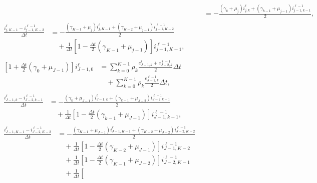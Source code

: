 \documentclass[USenglish]{article}
\begin{document}
\begin{subequations}
\begin{align}
    &= - \frac{(\gamma_k + \mu_j) i_{j, k}^{\ell}
      + (\gamma_{k - 1} + \mu_{j - 1}) i_{j - 1, k - 1}^{\ell - 1}}
    {2},
    \\
    \begin{split}
      \frac{i_{j, K - 1}^{\ell} - i_{j - 1, K - 2}^{\ell - 1}}{\Delta t}
      &= - \frac{(\gamma_{K - 1} + \mu_j) i_{j, K - 1}^{\ell}
        + (\gamma_{K - 2} + \mu_{j - 1}) i_{j - 1, K - 2}^{\ell - 1}}
      {2}
      \\ & \quad {}
      + \frac{1}{\Delta t} \left[
        1 - \frac{\Delta t}{2} (\gamma_{K - 1} + \mu_{j - 1})
      \right] i_{j - 1, K - 1}^{\ell - 1},
    \end{split}
    \\
    \begin{split}
      \left[1 + \frac{\Delta t}{2} (\gamma_0 + \mu_{J - 1})\right]
      i_{J - 1, 0}^{\ell}
      &= \sum_{k = 0}^{K - 1} \rho_k
      \frac{e_{J - 1, k}^{\ell} + e_{J - 2, k}^{\ell - 1}} {2}
      \Delta t
      \\ & \quad {}
      + \sum_{k = 0}^{K - 1} \rho_k
      \frac{e_{J - 1, k}^{\ell - 1}} {2}
      \Delta t,
    \end{split}
    \\
    \begin{split}
      \frac{i_{J - 1, k}^{\ell} - i_{J - 2, k - 1}^{\ell - 1}}{\Delta t}
      &= - \frac{(\gamma_k + \mu_{J - 1}) i_{J - 1, k}^{\ell}
        + (\gamma_{k - 1} + \mu_{J - 2}) i_{J - 2, k - 1}^{\ell - 1}}
      {2}
      \\ & \quad {}
      + \frac{1}{\Delta t} \left[
        1 - \frac{\Delta t}{2} (\gamma_{k - 1} + \mu_{J - 1})
      \right] i_{J - 1, k - 1}^{\ell - 1},
    \end{split}
    \\
    \begin{split}
      \frac{i_{J - 1, K - 1}^{\ell} - i_{J - 2, K - 2}^{\ell - 1}}{\Delta t}
      &= - \frac{(\gamma_{K - 1} + \mu_{J - 1}) i_{J - 1, K - 1}^{\ell}
        + (\gamma_{K - 2} + \mu_{J - 2}) i_{J - 2, K - 2}^{\ell - 1}}
      {2}
      \\ & \quad {}
      + \frac{1}{\Delta t} \left[
        1 - \frac{\Delta t}{2} (\gamma_{K - 2} + \mu_{J - 1})
      \right] i_{J - 1, K - 2}^{\ell - 1}
      \\ & \quad {}
      + \frac{1}{\Delta t} \left[
        1 - \frac{\Delta t}{2} (\gamma_{K - 1} + \mu_{J - 2})
      \right] i_{J - 2, K - 1}^{\ell - 1}
      \\ & \quad {}
      + \frac{1}{\Delta t} \left[

\end{split}
\end{align}
\end{subequations}
\end{document}
